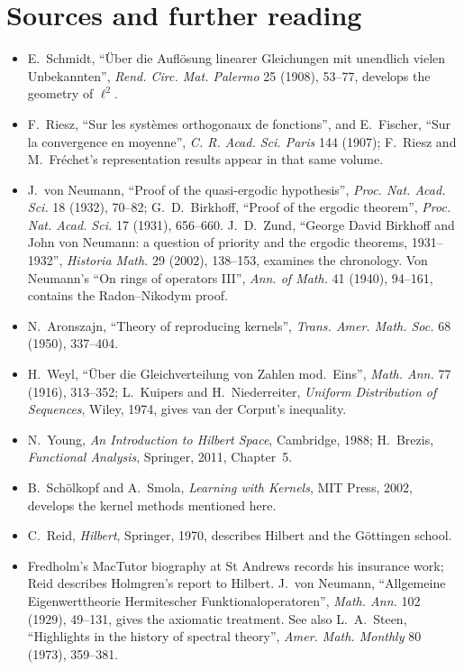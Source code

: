 \section*{Sources and further reading}
\begin{itemize}
\item E.~Schmidt, ``\"Uber die Aufl\"osung linearer Gleichungen mit unendlich vielen Unbekannten'', \emph{Rend. Circ. Mat. Palermo} 25 (1908), 53--77, develops the geometry of $\ell^2$.
\item F.~Riesz, ``Sur les syst\`emes orthogonaux de fonctions'', and E.~Fischer, ``Sur la convergence en moyenne'', \emph{C. R. Acad. Sci. Paris} 144 (1907); F.~Riesz and M.~Fr\'echet's representation results appear in that same volume.
\item J.~von Neumann, ``Proof of the quasi-ergodic hypothesis'', \emph{Proc. Nat. Acad. Sci.} 18 (1932), 70--82; G.~D.~Birkhoff, ``Proof of the ergodic theorem'', \emph{Proc. Nat. Acad. Sci.} 17 (1931), 656--660. J.~D.~Zund, ``George David Birkhoff and John von Neumann: a question of priority and the ergodic theorems, 1931--1932'', \emph{Historia Math.} 29 (2002), 138--153, examines the chronology. Von Neumann's ``On rings of operators III'', \emph{Ann. of Math.} 41 (1940), 94--161, contains the Radon--Nikodym proof.
\item N.~Aronszajn, ``Theory of reproducing kernels'', \emph{Trans. Amer. Math. Soc.} 68 (1950), 337--404.
\item H.~Weyl, ``\"Uber die Gleichverteilung von Zahlen mod.~Eins'', \emph{Math. Ann.} 77 (1916), 313--352; L.~Kuipers and H.~Niederreiter, \emph{Uniform Distribution of Sequences}, Wiley, 1974, gives van der Corput's inequality.
\item N.~Young, \emph{An Introduction to Hilbert Space}, Cambridge, 1988; H.~Brezis, \emph{Functional Analysis}, Springer, 2011, Chapter~5.
\item B.~Sch\"olkopf and A.~Smola, \emph{Learning with Kernels}, MIT Press, 2002, develops the kernel methods mentioned here.
\item C.~Reid, \emph{Hilbert}, Springer, 1970, describes Hilbert and the G\"ottingen school.
\item Fredholm's MacTutor biography at St Andrews records his insurance work; Reid describes Holmgren's report to Hilbert. J.~von Neumann, ``Allgemeine Eigenwerttheorie Hermitescher Funktionaloperatoren'', \emph{Math. Ann.} 102 (1929), 49--131, gives the axiomatic treatment. See also L.~A.~Steen, ``Highlights in the history of spectral theory'', \emph{Amer. Math. Monthly} 80 (1973), 359--381.
\end{itemize}
